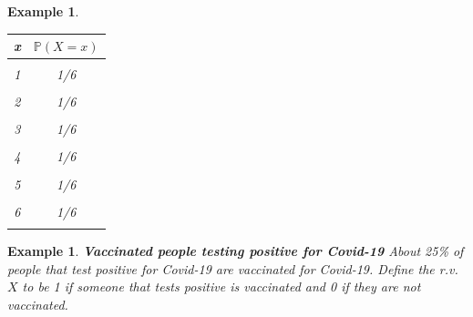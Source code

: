 \documentclass[12pt]{amsart}
\newtheorem{example}[theorem]{Example}
\begin{document}
{\begin{example}
\vspace{1cm}
\begin{tabular}{| c | c |}
  \hline                       
  x & $\mathbb{P}(X=x)$  \\
   \hline     
      &  \\
  1 & 1/6 \\
     &  \\
  2 & 1/6  \\
      &  \\
  3 & 1/6  \\
      &  \\
  4 & 1/6  \\
      &  \\
  5 & 1/6  \\
      &  \\
  6 & 1/6  \\
      &  \\
  \hline  
\end{tabular}

%
%
%




\end{example} 



 \newpage

\begin{example}  \textbf{Vaccinated people testing positive for Covid-19} \newline
About 25\% of people that test positive for Covid-19 are vaccinated for Covid-19.\newline
Define the r.v. $X$ to be 1 if someone that tests positive is vaccinated and 0 if they are not vaccinated.



\end{example}}
\end{document}
